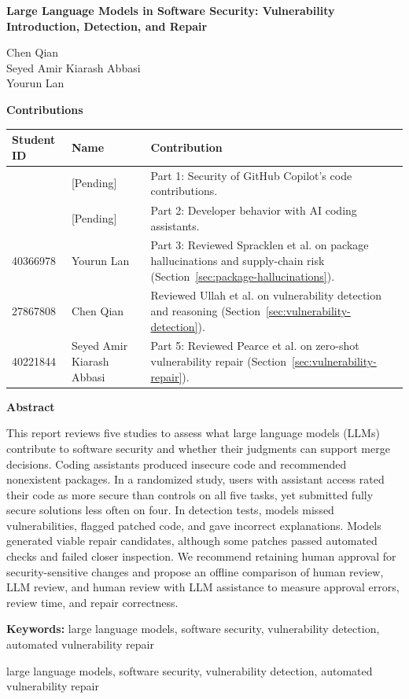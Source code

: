 \documentclass[conference]{IEEEtran}
\title{\reporttitle}
\author{}
\newcommand{\reporttitle}{Large Language Models in Software Security: Vulnerability Introduction, Detection, and Repair}
\newcommand{\reportabstract}{This report reviews five studies to assess what large language models (LLMs) contribute to software security and whether their judgments can support merge decisions. Coding assistants produced insecure code and recommended nonexistent packages. In a randomized study, users with assistant access rated their code as more secure than controls on all five tasks, yet submitted fully secure solutions less often on four. In detection tests, models missed vulnerabilities, flagged patched code, and gave incorrect explanations. Models generated viable repair candidates, although some patches passed automated checks and failed closer inspection. We recommend retaining human approval for security-sensitive changes and propose an offline comparison of human review, LLM review, and human review with LLM assistance to measure approval errors, review time, and repair correctness.}
\newcommand{\reportkeywords}{large language models, software security, vulnerability detection, automated vulnerability repair}
\begin{document}
\onecolumn
\thispagestyle{empty}
\begin{center}
\vspace*{0.7in}
{\LARGE\bfseries \reporttitle\par}
\vspace{0.35in}
Chen Qian  \\
Seyed Amir Kiarash Abbasi  \\
Yourun Lan 
\end{center}

\vspace{0.3in}
\begin{center}
\textbf{Contributions}
\end{center}
\noindent\begin{tabular}{|p{}|p{}|p{}|}
\hline
\textbf{Student ID} & \textbf{Name} & \textbf{Contribution} \\
\hline
[Pending] & [Pending] & Part 1: Security of GitHub Copilot's code contributions. \\
\hline
[Pending] & [Pending] & Part 2: Developer behavior with AI coding assistants. \\
\hline
40366978 & Yourun Lan & Part 3: Reviewed Spracklen et al. on package hallucinations and supply-chain risk (Section~\ref{sec:package-hallucinations}). \\
\hline
27867808 & Chen Qian & Reviewed Ullah et al. on vulnerability detection and reasoning (Section~\ref{sec:vulnerability-detection}). \\
\hline
40221844 & Seyed Amir Kiarash Abbasi & Part 5: Reviewed Pearce et al. on zero-shot vulnerability repair (Section~\ref{sec:vulnerability-repair}). \\
\hline
\end{tabular}

\vspace{0.3in}
\noindent\textbf{Abstract}\par
\smallskip
\noindent\reportabstract

\medskip
\noindent\textbf{Keywords:} \reportkeywords

\clearpage
\twocolumn
\setcounter{page}{2}
\pagestyle{plain}
\maketitle
\thispagestyle{plain}

\begin{abstract}
\reportabstract
\end{abstract}
\begin{IEEEkeywords}
\reportkeywords
\end{IEEEkeywords}
\end{document}
